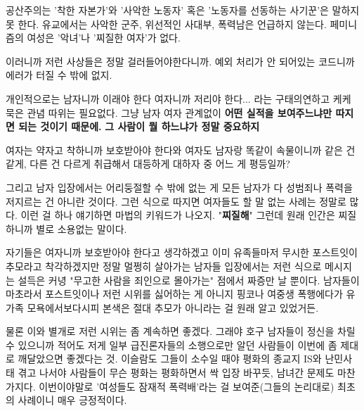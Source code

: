 \begin{enumerate}
  
    공산주의는 '착한 자본가'와 '사악한 노동자' 혹은 '노동자를 선동하는 사기꾼'은 말하지 못 한다.
    유교에서는 사악한 군주, 위선적인 사대부, 폭력남은 언급하지 않는다.
    페미니즘의 여성은 '악녀'나 '찌질한 여자'가 없다.
    \vspace{5mm}
  
  
    이러니까 저런 사상들은 정말 걸러들어야한다니까. 예외 처리가 안 되어있는 코드니까 에러가 터질 수 밖에 없지.
    \vspace{5mm}
  
  
    개인적으로는 남자니까 이래야 한다 여자니까 저리야 한다... 라는 구태의연하고 케케묵은 관념 따위는 필요없다.
    그냥 남자 여자 관계없이 \textbf{어떤 실적을 보여주느냐만 따지면 되는 것이기 때문에.}
    \textbf{그 사람이 뭘 하느냐가 정말 중요하지}
  
    \vspace{5mm}
  
    여자는 약자고 착하니까 보호받아야 한다와
    여자도 남자랑 똑같이 속물이니까 같은 건 같게, 다른 건 다르게 취급해서 대등하게 대하자 중 어느 게 평등일까?
    \vspace{5mm}
   
  
    그리고 남자 입장에서는 어리둥절할 수 밖에 없는 게
    모든 남자가 다 성범죄나 폭력을 저지르는 건 아니란 것이다.
    그런 식으로 따지면 여자들도 할 말 없는 사례는 정말로 많다.
    이런 걸 하나 얘기하면 마법의 키워드가 나오지. "\textbf{찌질해}"
    그런데 원래 인간은 찌질하니까 별로 소용없는 말이다.
  
    \vspace{5mm}
  
    자기들은 여자니까 보호받아야 한다고 생각하겠고 이미 유족들마저 무시한 포스트잇이 추모라고 착각하겠지만
    정말 멀쩡히 살아가는 남자들 입장에서는 저런 식으로 메시지는 설득은 커녕 "무고한 사람을 죄인으로 몰아가는" 점에서 짜증만 날 뿐이다.
    남자들이 마초라서 포스트잇이나 저런 시위를 싫어하는 게 아니지
    핑코나 여중생 폭행에다가 유가족 모욕에서보다시피 본색은 절대 추모가 아니라는 걸 원래 알고 있었거든.
  
    \vspace{5mm}
  
    물론 이와 별개로 저런 시위는 좀 계속하면 좋겠다. 그래야 호구 남자들이 정신을 차릴 수 있으니까
    적어도 저게 일부 급진론자들의 소행으로만 알던 사람들이 이번에 좀 제대로 깨달았으면 좋겠다는 것.
    이슬람도 그들이 소수일 때야 평화의 종교지 IS와 난민사태 겪고 나서야 사람들이 무슨 평화는 평화하면서 싹 입장 바꾸듯,
    남녀간 문제도 마찬가지다. 이번이야말로 '여성들도 잠재적 폭력배'라는 걸 보여준(그들의 논리대로) 최초의 사례이니 매우 긍정적이다.
    \vspace{5mm}
  

\end{enumerate}
